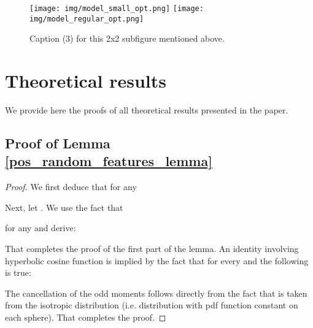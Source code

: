 \clearpage
\begin{figure}[ht]
  \texttt{[image: img/model\_small\_opt.png]}
  \texttt{[image: img/model\_regular\_opt.png]}

  \caption{Caption (3) for this 2x2 subfigure mentioned above.}
  \label{fig:appendix_runtime_2}
\end{figure}





\clearpage

\section{Theoretical results}
\label{appendix:theoretical_results}
We provide here the proofs of all theoretical results presented in the paper.

\subsection{Proof of Lemma \ref{pos_random_features_lemma}}

\begin{proof}
We first deduce that for any 

Next, let . We use the fact that

for any  and derive:

That completes the proof of the first part of the lemma. An identity involving hyperbolic cosine function is implied by the fact that for every  and  the following is true:

The cancellation of the odd moments  follows directly from the fact that  is taken from the isotropic distribution (i.e. distribution with pdf function constant on each sphere).
That completes the proof.
\end{proof}

